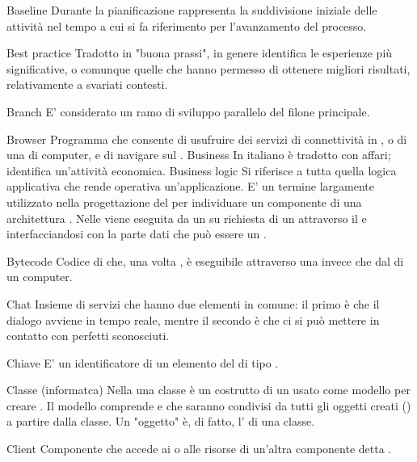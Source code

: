 \elemento
{Baseline}
{Durante la pianificazione rappresenta la suddivisione iniziale delle attività nel tempo a cui si fa riferimento per l'avanzamento del processo.}

\elemento
{Best practice} 
{Tradotto in "buona prassi", in genere identifica le esperienze più significative, o comunque quelle che hanno permesso di ottenere migliori risultati, relativamente a svariati contesti.}

\elemento
{Branch}
{E' considerato un ramo di sviluppo parallelo del filone principale.}

\elemento
{Browser} 
{Programma che consente di usufruire dei servizi di connettività in , o di una  di computer, e di navigare sul .}
\elemento
{Business}
{In italiano è tradotto con affari; identifica un'attività economica.}
\elemento
{Business logic} 
{Si riferisce a tutta quella logica applicativa che rende operativa un'applicazione. E' un termine largamente utilizzato nella progettazione del  per individuare un componente  di una architettura . Nelle  viene eseguita da un  su richiesta di un  attraverso il  e interfacciandosi con la parte dati che può essere un .}



\elemento
{Bytecode} 
{Codice di  che, una volta , è eseguibile attraverso una  invece che dal  di un computer.}


\elemento
{Chat}
{Insieme di servizi che hanno due elementi in comune: il primo è che il dialogo avviene in tempo reale, mentre il secondo è che ci si può mettere in contatto con perfetti sconosciuti.}

\elemento
{Chiave}
{E' un identificatore di un elemento del  di tipo .}

\elemento
{Classe (informatca)}
{Nella   una classe è un costrutto di un  usato come modello per creare . Il modello comprende  e  che saranno condivisi da tutti gli oggetti creati () a partire dalla classe. Un "oggetto" è, di fatto, l' di una classe.}

\elemento
{Client} 
{Componente che accede ai  o alle risorse di un'altra componente detta .} 

